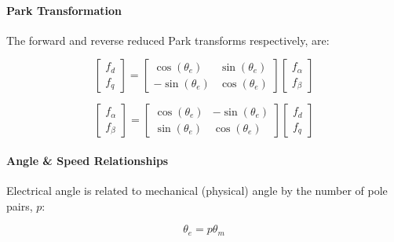 \documentclass{article}
\begin{document}
\paragraph{Park Transformation}


The forward and reverse reduced Park transforms respectively, are:

\begin{equation}
    \begin{bmatrix}
        f_d \\
        f_q
    \end{bmatrix}
    =
    \begin{bmatrix}
        \cos(\theta_e) & \sin(\theta_e) \\
        -\sin(\theta_e) & \cos(\theta_e)
    \end{bmatrix}
    \begin{bmatrix}
        f_\alpha \\
        f_\beta
    \end{bmatrix}
\end{equation}

\begin{equation}
    \begin{bmatrix}
        f_\alpha \\
        f_\beta
    \end{bmatrix}
    =
    \begin{bmatrix}
        \cos(\theta_e) & -\sin(\theta_e) \\
        \sin(\theta_e) & \cos(\theta_e)
    \end{bmatrix}
    \begin{bmatrix}
        f_d \\
        f_q
    \end{bmatrix}
\end{equation}


\paragraph{Angle \& Speed Relationships}

Electrical angle is related to mechanical (physical) angle by the number of pole pairs, $p$:

\begin{equation}
    \theta_e = p\theta_m
\end{equation}
\end{document}
